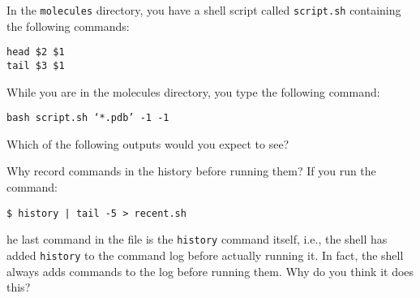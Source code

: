 \documentclass{beamer}
\begin{document}
\begin{frame}{}
In the \texttt{molecules} directory, you have a shell script called \texttt{script.sh} containing the following commands:
\begin{beamerboxesrounded}[upper=uppercolgreen,lower=lowercolgreen,shadow=false]{}
\small{\texttt{head \$2 \$1 \\ tail \$3 \$1}}
\end{beamerboxesrounded}

While you are in the molecules directory, you type the following command:

\begin{beamerboxesrounded}[upper=uppercolgreen,lower=lowercolgreen,shadow=false]{}
\small{\texttt{bash script.sh `*.pdb' -1 -1}}
\end{beamerboxesrounded}

Which of the following outputs would you expect to see?



\end{frame}


\begin{frame}{Why record commands in the history before running them?}
If you run the command:

\vspace{0.5cm}


\begin{beamerboxesrounded}[upper=uppercolgreen,lower=lowercolgreen,shadow=false]{}
\small{\texttt{\$ history | tail -5 > recent.sh}}
\end{beamerboxesrounded}

\vspace{0.5cm}

he last command in the file is the \texttt{history} command itself, i.e., the shell has added \texttt{history} to the command log before actually running it. In fact, the shell always adds commands to the log before running them. Why do you think it does this?
\end{frame}
\end{document}
